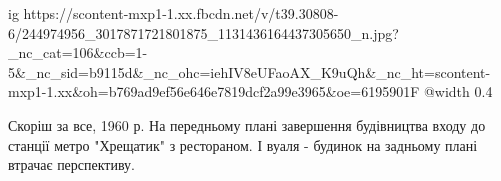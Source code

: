  
 
 
 
 

\ifcmt
  ig https://scontent-mxp1-1.xx.fbcdn.net/v/t39.30808-6/244974956_3017871721801875_1131436164437305650_n.jpg?_nc_cat=106&ccb=1-5&_nc_sid=b9115d&_nc_ohc=iehIV8eUFaoAX_K9uQh&_nc_ht=scontent-mxp1-1.xx&oh=b769ad9ef56e646e7819dcf2a99e3965&oe=6195901F
  @width 0.4
\fi


Скоріш за все, 1960 р. На передньому плані завершення будівництва входу до
станції метро "Хрещатик" з рестораном. І вуаля - будинок на задньому плані
втрачає перспективу.
